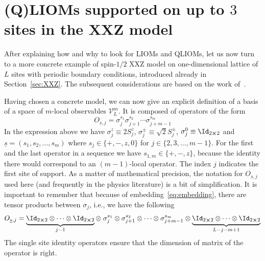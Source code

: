 
\section{(Q)LIOMs supported on up to \(3\) sites in the XXZ model\label{sec:example}}

After explaining how and why to look for LIOMs and QLIOMs, let us now turn to a more concrete
example of spin-\(1/2\) XXZ model on one-dimensional lattice of \(L\) sites with periodic
boundary conditions, introduced already in Section~\ref{sec:XXZ}. The subsequent
considerations are based on the work of~\textcite{Mierzejewski2015a}.

Having chosen a concrete model, we can now give an explicit definition of a basis
of a space of \(m\)-local observables \(\mathcal{V}_L^m\). It is composed of operators
of the form
\begin{equation}
  O_{\underline{s},j}=\sigma_{j}^{s_{1}} \sigma_{j+1}^{s_{2}} \cdots 
  \sigma_{j+m-1}^{s_{m}}
  \label{eq:basis operator}
\end{equation}
In the expression above we have \(\sigma_j^z \equiv 2 S^z_j\),
\(\sigma_j^{\pm} \equiv \sqrt{2} S_j^{\pm}\), \(\sigma^{0}_j \equiv \Id_{2\cross 2}\) and
 \(\underline{s} = \left(s_1, s_2,\ldots, s_m\right)\) where \(s_j \in \{+,-,z,0\}\) for
 \(j \in \{2,3,\ldots,m-1\}\). For the first and the last operator in a sequence we have 
 \(s_{1,m} \in \{+,-,z\}\), because the identity there would correspond to an \((m-1)\)-local
 operator. The index \(j\) indicates the first site of support.
As a matter of mathematical precision, the notation for \(O_{\underline{s},j}\) used here 
(and frequently in the physics literature) is a bit of simplification. It is important to remember
that because of embedding~\eqref{eq:embedding}, there are tensor products between \(\sigma_j\), i.e., we have the following
\begin{equation}
  O_{\underline{s},j}= \underbrace{\Id_{2\cross 2} \otimes \cdots
       \otimes \Id_{2\cross 2}}_{j-1} \otimes \; \sigma_{j}^{s_{1}} \otimes \sigma_{j+1}^{s_{2}} \otimes
        \cdots \otimes \sigma_{j+m-1}^{s_{m}} \otimes 
        \underbrace{\Id_{2\cross 2} \otimes \cdots \otimes \Id_{2\cross 2}}_{L-j-m+1}
        \label{eq:basis with tensors}
\end{equation}
The single site identity operators ensure that the dimension of matrix of the operator is right.
